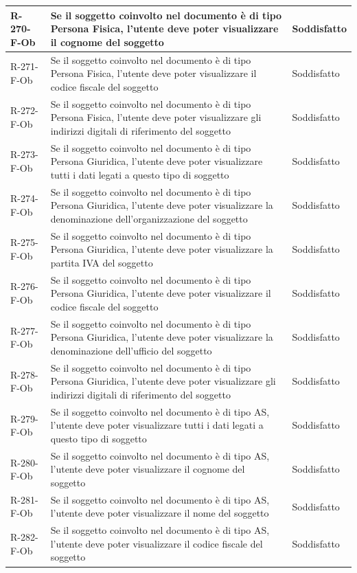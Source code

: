 \begin{longtable}{|p{2.5cm}|p{9.5cm}|p{2.5cm}|}
\hline
R-270-F-Ob & Se il soggetto coinvolto nel documento è di tipo Persona Fisica, l'utente deve poter visualizzare il cognome del soggetto & Soddisfatto \\
\hline
R-271-F-Ob & Se il soggetto coinvolto nel documento è di tipo Persona Fisica, l'utente deve poter visualizzare il codice fiscale del soggetto & Soddisfatto \\
\hline
R-272-F-Ob & Se il soggetto coinvolto nel documento è di tipo Persona Fisica, l'utente deve poter visualizzare gli indirizzi digitali di riferimento del soggetto & Soddisfatto \\
\hline
R-273-F-Ob & Se il soggetto coinvolto nel documento è di tipo Persona Giuridica, l'utente deve poter visualizzare tutti i dati legati a questo tipo di soggetto & Soddisfatto \\
\hline
R-274-F-Ob & Se il soggetto coinvolto nel documento è di tipo Persona Giuridica, l'utente deve poter visualizzare la denominazione dell'organizzazione del soggetto & Soddisfatto \\
\hline
R-275-F-Ob & Se il soggetto coinvolto nel documento è di tipo Persona Giuridica, l'utente deve poter visualizzare la partita IVA del soggetto & Soddisfatto \\
\hline
R-276-F-Ob & Se il soggetto coinvolto nel documento è di tipo Persona Giuridica, l'utente deve poter visualizzare il codice fiscale del soggetto & Soddisfatto \\
\hline
R-277-F-Ob & Se il soggetto coinvolto nel documento è di tipo Persona Giuridica, l'utente deve poter visualizzare la denominazione dell'ufficio del soggetto & Soddisfatto \\
\hline
R-278-F-Ob & Se il soggetto coinvolto nel documento è di tipo Persona Giuridica, l'utente deve poter visualizzare gli indirizzi digitali di riferimento del soggetto & Soddisfatto \\
\hline
R-279-F-Ob & Se il soggetto coinvolto nel documento è di tipo AS, l'utente deve poter visualizzare tutti i dati legati a questo tipo di soggetto & Soddisfatto \\
\hline
R-280-F-Ob & Se il soggetto coinvolto nel documento è di tipo AS, l'utente deve poter visualizzare il cognome del soggetto & Soddisfatto \\
\hline
R-281-F-Ob & Se il soggetto coinvolto nel documento è di tipo AS, l'utente deve poter visualizzare il nome del soggetto & Soddisfatto \\
\hline
R-282-F-Ob & Se il soggetto coinvolto nel documento è di tipo AS, l'utente deve poter visualizzare il codice fiscale del soggetto & Soddisfatto \\

\end{longtable}
